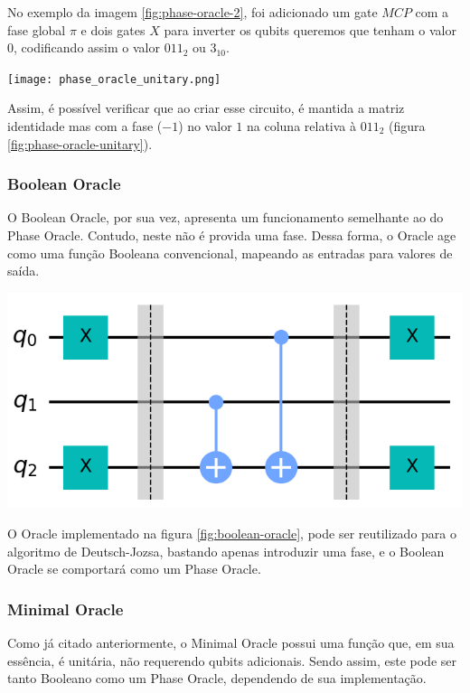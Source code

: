 \documentclass{article}
\begin{document}
No exemplo da imagem \ref{fig:phase-oracle-2}, foi adicionado um gate $MCP$ com a fase global $\pi$ e dois gates $X$ para inverter os qubits queremos que tenham o valor $0$, codificando assim o valor $011_{2}$ ou $3_{10}$.

\begin{center}
	\texttt{[image: phase\_oracle\_unitary.png]}
	\label{fig:phase-oracle-unitary}
\end{center}

Assim, é possível verificar que ao criar esse circuito, é mantida a matriz identidade mas com a fase ($-1$) no valor $1$ na coluna relativa à $011_{2}$ (figura \ref{fig:phase-oracle-unitary}). 


\subsubsection{Boolean Oracle}
O Boolean Oracle, por sua vez, apresenta um funcionamento semelhante ao do Phase Oracle. Contudo, neste não é provida uma fase. Dessa forma, o Oracle age como uma função Booleana convencional, mapeando as entradas para valores de saída.

\begin{center}
	\includegraphics[scale=0.3]{balanced-oracle.png}
	\label{fig:boolean-oracle}
\end{center}

O Oracle implementado na figura \ref{fig:boolean-oracle}, pode ser reutilizado para o algoritmo de Deutsch-Jozsa, bastando apenas introduzir uma fase, e o Boolean Oracle se comportará como um Phase Oracle.

\subsubsection{Minimal Oracle}
Como já citado anteriormente, o Minimal Oracle possui uma função que, em sua essência, é unitária, não requerendo qubits adicionais. Sendo assim, este pode ser tanto Booleano como um Phase Oracle, dependendo de sua implementação.
\end{document}
